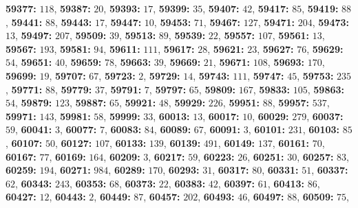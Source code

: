\textsf{\bfseries 59377:} $118$, \textsf{\bfseries 59387:} $20$, \textsf{\bfseries 59393:} $17$, \textsf{\bfseries 59399:} $35$, \textsf{\bfseries 59407:} $42$, \textsf{\bfseries 59417:} $85$, \textsf{\bfseries 59419:} $88$, \textsf{\bfseries 59441:} $88$, \textsf{\bfseries 59443:} $17$, \textsf{\bfseries 59447:} $10$, \textsf{\bfseries 59453:} $71$, \textsf{\bfseries 59467:} $127$, \textsf{\bfseries 59471:} $204$, \textsf{\bfseries 59473:} $13$, \textsf{\bfseries 59497:} $207$, \textsf{\bfseries 59509:} $39$, \textsf{\bfseries 59513:} $89$, \textsf{\bfseries 59539:} $22$, \textsf{\bfseries 59557:} $107$, \textsf{\bfseries 59561:} $13$, \textsf{\bfseries 59567:} $193$, \textsf{\bfseries 59581:} $94$, \textsf{\bfseries 59611:} $111$, \textsf{\bfseries 59617:} $28$, \textsf{\bfseries 59621:} $23$, \textsf{\bfseries 59627:} $76$, \textsf{\bfseries 59629:} $54$, \textsf{\bfseries 59651:} $40$, \textsf{\bfseries 59659:} $78$, \textsf{\bfseries 59663:} $39$, \textsf{\bfseries 59669:} $21$, \textsf{\bfseries 59671:} $108$, \textsf{\bfseries 59693:} $170$, \textsf{\bfseries 59699:} $19$, \textsf{\bfseries 59707:} $67$, \textsf{\bfseries 59723:} $2$, \textsf{\bfseries 59729:} $14$, \textsf{\bfseries 59743:} $111$, \textsf{\bfseries 59747:} $45$, \textsf{\bfseries 59753:} $235$, \textsf{\bfseries 59771:} $88$, \textsf{\bfseries 59779:} $37$, \textsf{\bfseries 59791:} $7$, \textsf{\bfseries 59797:} $65$, \textsf{\bfseries 59809:} $167$, \textsf{\bfseries 59833:} $105$, \textsf{\bfseries 59863:} $54$, \textsf{\bfseries 59879:} $123$, \textsf{\bfseries 59887:} $65$, \textsf{\bfseries 59921:} $48$, \textsf{\bfseries 59929:} $226$, \textsf{\bfseries 59951:} $88$, \textsf{\bfseries 59957:} $537$, \textsf{\bfseries 59971:} $143$, \textsf{\bfseries 59981:} $58$, \textsf{\bfseries 59999:} $33$, \textsf{\bfseries 60013:} $13$, \textsf{\bfseries 60017:} $10$, \textsf{\bfseries 60029:} $279$, \textsf{\bfseries 60037:} $59$, \textsf{\bfseries 60041:} $3$, \textsf{\bfseries 60077:} $7$, \textsf{\bfseries 60083:} $84$, \textsf{\bfseries 60089:} $67$, \textsf{\bfseries 60091:} $3$, \textsf{\bfseries 60101:} $231$, \textsf{\bfseries 60103:} $85$, \textsf{\bfseries 60107:} $50$, \textsf{\bfseries 60127:} $107$, \textsf{\bfseries 60133:} $139$, \textsf{\bfseries 60139:} $491$, \textsf{\bfseries 60149:} $137$, \textsf{\bfseries 60161:} $70$, \textsf{\bfseries 60167:} $77$, \textsf{\bfseries 60169:} $164$, \textsf{\bfseries 60209:} $3$, \textsf{\bfseries 60217:} $59$, \textsf{\bfseries 60223:} $26$, \textsf{\bfseries 60251:} $30$, \textsf{\bfseries 60257:} $83$, \textsf{\bfseries 60259:} $194$, \textsf{\bfseries 60271:} $984$, \textsf{\bfseries 60289:} $170$, \textsf{\bfseries 60293:} $31$, \textsf{\bfseries 60317:} $80$, \textsf{\bfseries 60331:} $51$, \textsf{\bfseries 60337:} $62$, \textsf{\bfseries 60343:} $243$, \textsf{\bfseries 60353:} $68$, \textsf{\bfseries 60373:} $22$, \textsf{\bfseries 60383:} $42$, \textsf{\bfseries 60397:} $61$, \textsf{\bfseries 60413:} $86$, \textsf{\bfseries 60427:} $12$, \textsf{\bfseries 60443:} $2$, \textsf{\bfseries 60449:} $87$, \textsf{\bfseries 60457:} $202$, \textsf{\bfseries 60493:} $46$, \textsf{\bfseries 60497:} $88$, \textsf{\bfseries 60509:} $75$, 
